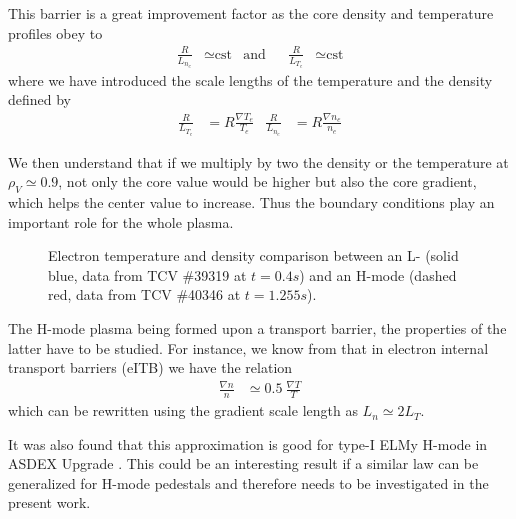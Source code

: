 This barrier is a great improvement factor as the core density and temperature profiles obey to \cite{ryter2001}
\begin{align}\label{eq:confinement:Hmode:RLc}
	\frac{R}{L_{n_e}} & \simeq \textrm{cst} & \textrm{and} && \frac{R}{L_{T_e}} & \simeq \textrm{cst}
\end{align}
where we have introduced the scale lengths of the temperature and the density defined by
\begin{align*}
	\frac{R}{L_{T_e}} & = R \frac{\nabla T_e}{T_e} &
	\frac{R}{L_{n_e}} & = R \frac{\nabla n_e}{n_e}
\end{align*}

We then understand that if we multiply by two the density or the temperature at $\rho_V \simeq 0.9$, not only the core value would be higher but also the core gradient, which helps the center value to increase. Thus the boundary conditions play an important role for the whole plasma.

\begin{figure}[H]
\begin{center}
\hspace{3mm}
\vspace{-0.5cm}
\end{center}
\caption{\footnotesize Electron temperature and density comparison between an L- (solid blue, data from TCV \#39319 at $t = 0.4s$) and an H-mode (dashed red, data from TCV \#40346 at $t = 1.255s$).\label{fig:confinement:Hmode:LH}}
\vspace{-0.5cm}
\end{figure}
		
The H-mode plasma being formed upon a transport barrier, the properties of the latter have to be studied. For instance, we know from \cite{fable2006} that in electron internal transport barriers (eITB) we have the relation
\begin{align}\label{eq:confinement:Hmode:emil}
	\frac{\nabla n}{n} & \simeq 0.5\ \frac{\nabla T}{T}
\end{align} 
which can be rewritten using the gradient scale length as $L_n \simeq 2 L_T$.

It was also found that this approximation is good for type-I ELMy H-mode in ASDEX Upgrade \cite{neuhauser2002}. This could be an interesting result if a similar law can be generalized for H-mode pedestals and therefore needs to be investigated in the present work.
